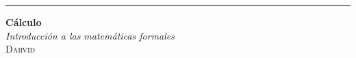 \begin{titlepage}
	
  \raggedleft

  \rule{1pt}{.9\textheight}
\hspace{0.075\textwidth}
\parbox[b]{.85\textwidth}{
  {\HUGE\bfseries Cálculo
      }\\[2\baselineskip]
  {\Large\textit{Introducción a las matemáticas formales}}\\[47.5\baselineskip]
      {\Large\textsc{Darvid}}\\[1\baselineskip]
}
\end{titlepage}
